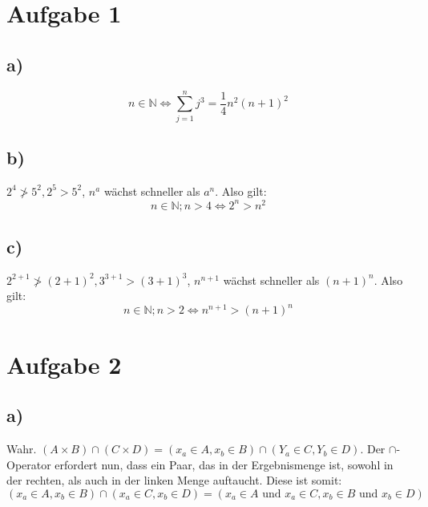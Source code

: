 \documentclass[12pt,a4paper,notitlepage]{article}
\title{}
\newcommand{\aufgabe}[1]{\section*{\setcounter{section}{#1}Aufgabe #1}}
\begin{document}
\aufgabe{1}
\subsection*{a)}
\begin{equation}
n\in\mathbb{N}\Leftrightarrow \sum^n_{j=1}j^3=\frac{1}{4}n^2(n+1)^2
\end{equation}
\subsection*{b)}$2^4\ngtr5^2, 2^5>5^2$, $n^a$ wächst schneller als $a^n$. Also gilt:
\begin{equation}
n\in\mathbb{N}; n>4\Leftrightarrow 2^n>n^2
\end{equation}
\subsection*{c)}$2^{2+1}\ngtr(2+1)^2, 3^{3+1}>(3+1)^3$, $n^{n+1}$ wächst schneller als $(n+1)^n$. Also gilt:
\begin{equation}
n\in\mathbb{N}; n>2\Leftrightarrow n^{n+1}>(n+1)^n
\end{equation}
\aufgabe{2}
\subsection*{a)}
Wahr. $(A\times B)\cap(C\times D) = (x_a\in A,x_b\in B)\cap(Y_a\in C,Y_b\in D)$. Der $\cap$-Operator erfordert nun, dass ein Paar, das in der Ergebnismenge ist, sowohl in der rechten, als auch in der linken Menge auftaucht. Diese ist somit: $(x_a\in A,x_b\in B)\cap(x_a\in C,x_b\in D)=(x_a\in A\text{ und } x_a\in C,x_b\in B\text{ und } x_b\in D)$
\end{document}
